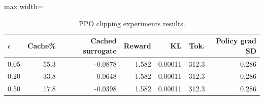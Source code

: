 \begin{table}[!htbp]

\scriptsize
\setlength{\tabcolsep}{3.4pt}
\begin{adjustbox}{max width=\linewidth}
\begin{tabular}{lrrrrrr}
\toprule
$\epsilon$ & Cache\% & Cached surrogate & Reward & KL & Tok. & Policy grad SD \\
\midrule
0.05 & 55.3 & -0.0878 & 1.582 & 0.00011 & 312.3 & 0.286 \\
0.20 & 33.8 & -0.0648 & 1.582 & 0.00011 & 312.3 & 0.286 \\
0.50 & 17.8 & -0.0398 & 1.582 & 0.00011 & 312.3 & 0.286 \\
\bottomrule
\end{tabular}

\centering
\end{adjustbox}

\caption{PPO clipping experiments results.}
\label{tab:ppo-clip}

\end{table}
